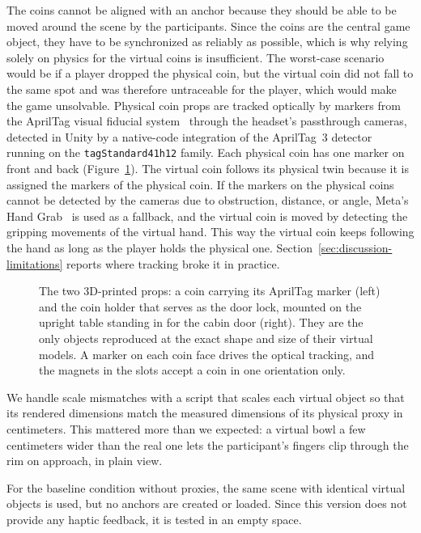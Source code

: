 The coins cannot be aligned with an anchor because they should be able to be moved around the scene by the participants. Since the coins are the central game object, they have to be synchronized as reliably as possible, which is why relying solely on physics for the virtual coins is insufficient. The worst-case scenario would be if a player dropped the physical coin, but the virtual coin did not fall to the same spot and was therefore untraceable for the player, which would make the game unsolvable. Physical coin props are tracked optically by markers from the AprilTag visual fiducial system~\cite{apriltag-repo} through the headset's passthrough cameras, detected in Unity by a native-code integration of the AprilTag~3 detector~\cite{apriltag-unity} running on the \texttt{tagStandard41h12} family. Each physical coin has one marker on front and back (Figure~\ref{fig:coin}). The virtual coin follows its physical twin because it is assigned the markers of the physical coin. If the markers on the physical coins cannot be detected by the cameras due to obstruction, distance, or angle, Meta's Hand Grab~\cite{meta-hand-grab} is used as a fallback, and the virtual coin is moved by detecting the gripping movements of the virtual hand. This way the virtual coin keeps following the hand as long as the player holds the physical one. Section~\ref{sec:discussion-limitations} reports where tracking broke it in practice.

\begin{figure}[t]
  \centering
  \begin{minipage}[t]{0.48\linewidth}
    \centering
  \end{minipage}\hfill
  \begin{minipage}[t]{0.48\linewidth}
    \centering
  \end{minipage}
  \caption{The two 3D-printed props: a coin carrying its AprilTag marker (left) and the coin holder that serves as the door lock, mounted on the upright table standing in for the cabin door (right). They are the only objects reproduced at the exact shape and size of their virtual models. A marker on each coin face drives the optical tracking, and the magnets in the slots accept a coin in one orientation only.}
  \label{fig:coin}
\end{figure}

We handle scale mismatches with a script that scales each virtual object so that its rendered dimensions match the measured dimensions of its physical proxy in centimeters. This mattered more than we expected: a virtual bowl a few centimeters wider than the real one lets the participant's fingers clip through the rim on approach, in plain view.

For the baseline condition without proxies, the same scene with identical virtual objects is used, but no anchors are created or loaded. Since this version does not provide any haptic feedback, it is tested in an empty space.
